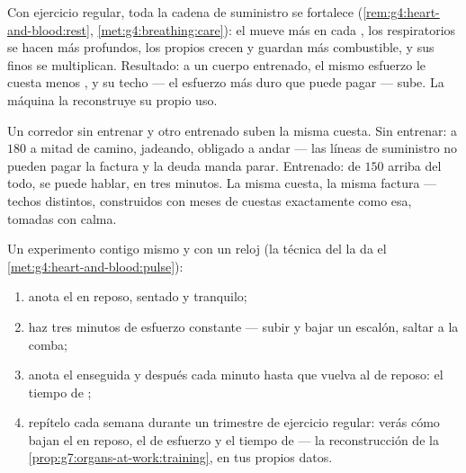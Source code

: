 \begin{proposition}\label{prop:g7:organs-at-work:training}
Con ejercicio regular, toda la cadena de suministro se fortalece
(\cref{rem:g4:heart-and-blood:rest},
\cref{met:g4:breathing:care}): el  mueve más  en cada
, los  respiratorios se hacen más profundos, los propios
 crecen y guardan más combustible, y sus  finos se
multiplican. Resultado: a un cuerpo entrenado, el mismo esfuerzo le
cuesta menos , y su techo --- el esfuerzo más duro que puede pagar
--- sube. La máquina la reconstruye su propio uso.
\end{proposition}
\admitted

\begin{example}\label{ex:g7:organs-at-work:runners}
Un corredor sin entrenar y otro entrenado suben la misma cuesta. Sin
entrenar:  a $180$ a mitad de camino, jadeando, obligado a andar
--- las líneas de suministro no pueden pagar la factura y la deuda
manda parar. Entrenado:  de $150$ arriba del todo, se puede
hablar,  en tres minutos. La misma cuesta, la misma factura
--- techos distintos, construidos con meses de cuestas exactamente como
esa, tomadas con calma.
\end{example}

\begin{method}\label{met:g7:organs-at-work:read}
Un experimento contigo mismo y con un reloj (la técnica del  la da
el \cref{met:g4:heart-and-blood:pulse}):
\begin{enumerate}
  \item anota el  en reposo, sentado y tranquilo;
  \item haz tres minutos de esfuerzo constante --- subir y bajar un
        escalón, saltar a la comba;
  \item anota el  enseguida y después cada minuto hasta que
        vuelva al de reposo: el tiempo de ;
  \item repítelo cada semana durante un trimestre de ejercicio regular:
        verás cómo bajan el  en reposo, el  de esfuerzo y el
        tiempo de  --- la reconstrucción de la
        \cref{prop:g7:organs-at-work:training}, en tus propios datos.
\end{enumerate}
\end{method}

